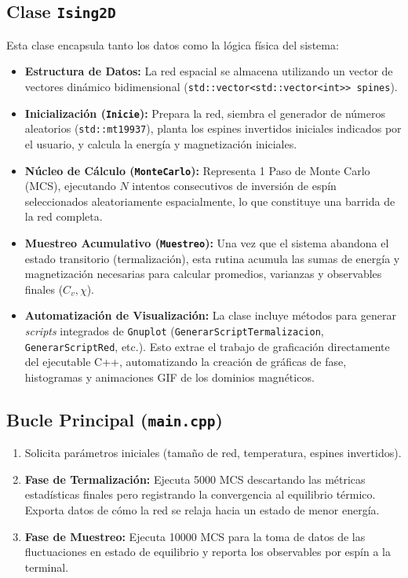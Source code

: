 \documentclass[11pt, a4paper]{article}
\begin{document}
\subsection*{Clase \texttt{Ising2D}}
Esta clase encapsula tanto los datos como la lógica física del sistema:
\begin{itemize}
    \item \textbf{Estructura de Datos:} La red espacial se almacena utilizando un vector de vectores dinámico bidimensional (\texttt{std::vector<std::vector<int>> spines}).
    \item \textbf{Inicialización (\texttt{Inicie}):} Prepara la red, siembra el generador de números aleatorios (\texttt{std::mt19937}), planta los espines invertidos iniciales indicados por el usuario, y calcula la energía y magnetización iniciales.
    \item \textbf{Núcleo de Cálculo (\texttt{MonteCarlo}):} Representa 1 Paso de Monte Carlo (MCS), ejecutando $N$ intentos consecutivos de inversión de espín seleccionados aleatoriamente espacialmente, lo que constituye una barrida de la red completa.
    \item \textbf{Muestreo Acumulativo (\texttt{Muestreo}):} Una vez que el sistema abandona el estado transitorio (termalización), esta rutina acumula las sumas de energía y magnetización necesarias para calcular promedios, varianzas y observables finales ($C_v, \chi$).
    \item \textbf{Automatización de Visualización:} La clase incluye métodos para generar \textit{scripts} integrados de \texttt{Gnuplot} (\texttt{GenerarScriptTermalizacion}, \texttt{GenerarScriptRed}, etc.). Esto extrae el trabajo de graficación directamente del ejecutable C++, automatizando la creación de gráficas de fase, histogramas y animaciones GIF de los dominios magnéticos.
\end{itemize}

\subsection*{Bucle Principal (\texttt{main.cpp})}
\begin{enumerate}
    \item Solicita parámetros iniciales (tamaño de red, temperatura, espines invertidos).
    \item \textbf{Fase de Termalización:} Ejecuta 5000 MCS descartando las métricas estadísticas finales pero registrando la convergencia al equilibrio térmico. Exporta datos de cómo la red se relaja hacia un estado de menor energía.
    \item \textbf{Fase de Muestreo:} Ejecuta 10000 MCS para la toma de datos de las fluctuaciones en estado de equilibrio y reporta los observables por espín a la terminal.
\end{enumerate}
\end{document}
